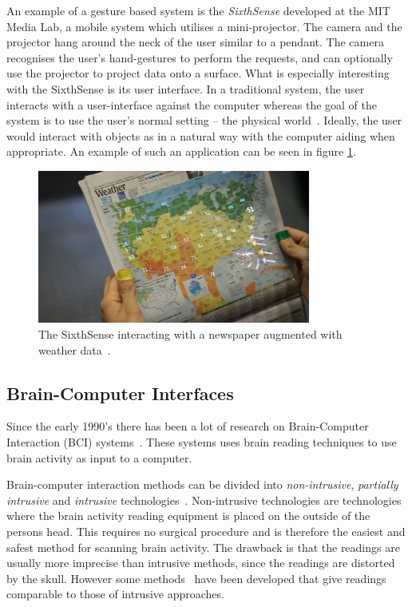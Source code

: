 An example of a gesture based system is the \emph{SixthSense} developed at the MIT Media Lab, a mobile system which utilises a mini-projector. The camera and the projector hang around the neck of the user similar to a pendant. The camera recognises the user's hand-gestures to perform the requests, and can optionally use the projector to project data onto a surface. What is especially interesting with the SixthSense is its user interface. In a traditional system, the user interacts with a user-interface against the computer whereas the goal of the system is to use the user's normal setting -- the physical world~\cite{Mistry:2009:SWG:1667146.1667160}. Ideally, the user would interact with objects as in a natural way with the computer aiding when appropriate. An example of such an application can be seen in figure \ref{sixthsense}.


\begin{figure}[]
\center
\includegraphics[width=0.8\textwidth] {bilder/newspaper.jpg}
\caption{The SixthSense interacting with a newspaper augmented with weather data~\cite{newspaper}.}
\label{sixthsense}
\end{figure}


\subsection{Brain-Computer Interfaces}

Since the early 1990's there has been a lot of research on Brain-Computer Interaction (BCI) systems~\cite{lebedev2006brain}. These systems uses brain reading techniques to use brain activity as input to a computer.

Brain-computer interaction methods can be divided into \emph{non-intrusive}, \emph{partially intrusive} and \emph{intrusive} technologies~\cite{legobrain}. Non-intrusive technologies are technologies where the brain activity reading equipment is placed on the outside of the persons head. This requires no surgical procedure and is therefore the easiest and safest method for scanning brain activity. The drawback is that the readings are usually more imprecise than intrusive methods, since the readings are distorted by the skull. However some methods~\cite{doud2011continuous} have been developed that give readings comparable to those of intrusive approaches.

